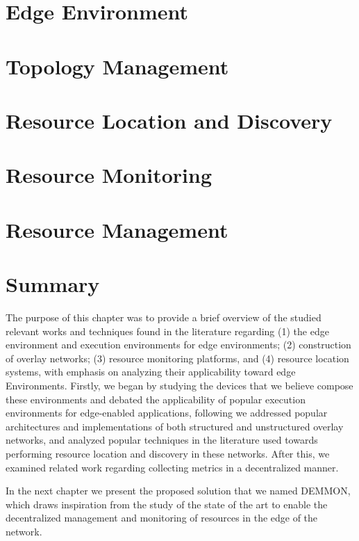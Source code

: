 \section{Edge Environment} \label{sec:edge_computing} 


\section{Topology Management} \label{sec:topology_management} 

\section{Resource Location and Discovery} \label{sec:res_location} 

\section{Resource Monitoring} \label{sec:res_monitoring} 

\section{Resource Management} \label{sec:res_management} 

\section{Summary}

The purpose of this chapter was to provide a brief overview of the studied relevant works and techniques found in the literature regarding (1) the edge environment and execution environments for edge environments; (2) construction of overlay networks; (3) resource monitoring platforms, and (4) resource location systems, with emphasis on analyzing their applicability toward edge Environments. Firstly, we began by studying the devices that we believe compose these environments and debated the applicability of popular execution environments for edge-enabled applications, following we addressed popular architectures and implementations of both structured and unstructured overlay networks, and analyzed popular techniques in the literature used towards performing resource location and discovery in these networks. After this, we examined related work regarding collecting metrics in a decentralized manner.

In the next chapter we present the proposed solution that we named DEMMON, which draws inspiration from the study of the state of the art to enable the decentralized management and monitoring of resources in the edge of the network.